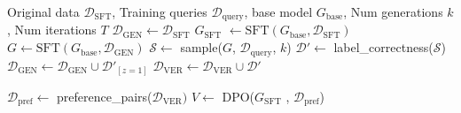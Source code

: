 \begin{algorithm}[H]%
   \caption{V-STaR}
   \label{alg:vstar}
\begin{algorithmic}
    Original data $\mathcal{D}_{\text{SFT}}$,  Training queries $\mathcal{D}_{\text{query}}$, base model $G_{\text{base}}$, Num generations $k$, Num iterations $T$
   \STATE $\mathcal{D}_{\text{GEN}} \gets \mathcal{D}_{\text{SFT}}$ 
   \STATE $G_{\text{SFT}}$ $\gets \text{SFT}(G_{\text{base}}, \mathcal{D}_{\text{SFT}})$
   \STATE \textcolor[HTML]{0077BB}{ $G \gets \text{SFT}(G_{\text{base}}, \mathcal{D}_{\text{GEN}})$}
   \hfill{}
   \STATE \textcolor[HTML]{0077BB} {$\mathcal{S} \gets$ sample($G$, $\mathcal{D}_{\text{query}}$, $k$)}
   \hfill{}
   \STATE \textcolor[HTML]{0077BB} {$\mathcal{D}' \gets$ label\_correctness($\mathcal{S}$)} 
   \hfill{}
   \STATE \textcolor[HTML]{0077BB}
{ $\mathcal{D}_{\text{GEN}} \gets \mathcal{D}_{\text{GEN}} \cup \mathcal{D}'_{[z = 1]}$ }
   \hfill{}
   \STATE \textcolor[HTML]{3C8031} {$\mathcal{D}_{\text{VER}} \gets \mathcal{D}_{\text{VER}} \cup \mathcal{D}'$}
   \hfill{}
   \ENDFOR

\STATE \textcolor[HTML]{3C8031} {$\mathcal{D}_{\text{pref}} \gets$ preference\_pairs($\mathcal{D}_{\text{VER}})$}
\STATE \textcolor[HTML]{3C8031} { $V \gets$ DPO($G_{\text{SFT}}$ , $\mathcal{D}_{\text{pref}}$)}
   
\end{algorithmic}
\end{algorithm}
